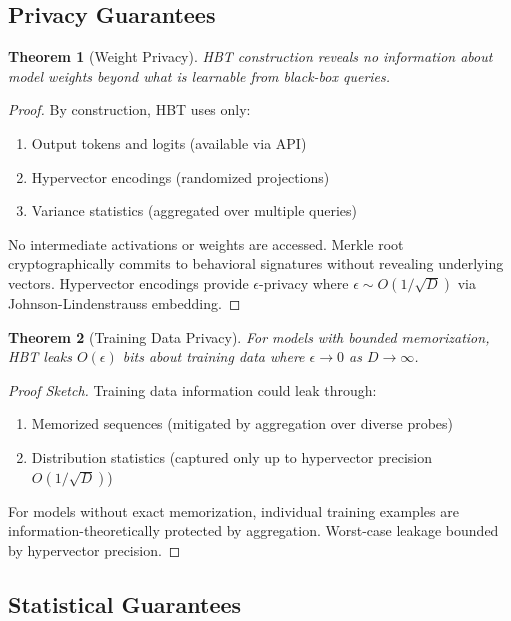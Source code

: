 \documentclass[11pt,a4paper]{article}
\newtheorem{theorem}{Theorem}
\begin{document}
\subsection{Privacy Guarantees}

\begin{theorem}[Weight Privacy]
HBT construction reveals no information about model weights beyond what is learnable from black-box queries.
\end{theorem}

\begin{proof}
By construction, HBT uses only:
\begin{enumerate}
\item Output tokens and logits (available via API)
\item Hypervector encodings (randomized projections)
\item Variance statistics (aggregated over multiple queries)
\end{enumerate}
No intermediate activations or weights are accessed. Merkle root cryptographically commits to behavioral signatures without revealing underlying vectors. Hypervector encodings provide $\epsilon$-privacy where $\epsilon \sim O(1/\sqrt{D})$ via Johnson-Lindenstrauss embedding.
\end{proof}

\begin{theorem}[Training Data Privacy]
For models with bounded memorization, HBT leaks $O(\epsilon)$ bits about training data where $\epsilon \to 0$ as $D \to \infty$.
\end{theorem}

\begin{proof}[Proof Sketch]
Training data information could leak through:
\begin{enumerate}
\item Memorized sequences (mitigated by aggregation over diverse probes)
\item Distribution statistics (captured only up to hypervector precision $O(1/\sqrt{D})$)
\end{enumerate}
For models without exact memorization, individual training examples are information-theoretically protected by aggregation. Worst-case leakage bounded by hypervector precision.
\end{proof}

\subsection{Statistical Guarantees}
\end{document}
